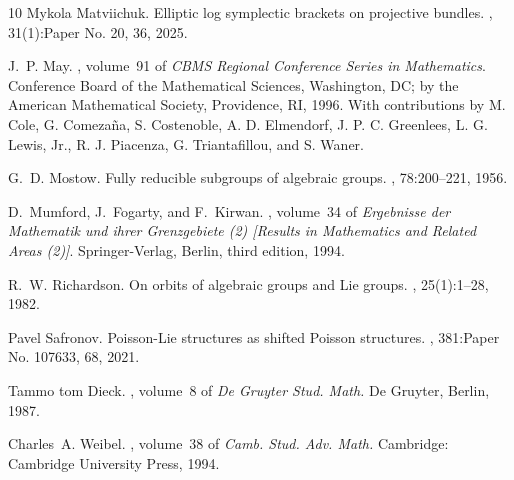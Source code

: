 \documentclass[11pt,leqno]{article}
\theoremstyle{plain}
\theoremstyle{plain}
\theoremstyle{plain}
\numberwithin{equation}{section}
\theoremstyle{nonumberplain}
\newcommand\1{{\bf 1}}
\begin{document}
\begin{thebibliography}{10}
Mykola Matviichuk.
\newblock Elliptic log symplectic brackets on projective bundles.
, 31(1):Paper No. 20, 36, 2025.

J.~P. May.
, volume~91 of {\em
  CBMS Regional Conference Series in Mathematics}.
\newblock Conference Board of the Mathematical Sciences, Washington, DC; by the
  American Mathematical Society, Providence, RI, 1996.
\newblock With contributions by M. Cole, G. Comeza\~na, S. Costenoble, A. D.
  Elmendorf, J. P. C. Greenlees, L. G. Lewis, Jr., R. J. Piacenza, G.
  Triantafillou, and S. Waner.

G.~D. Mostow.
\newblock Fully reducible subgroups of algebraic groups.
, 78:200--221, 1956.

D.~Mumford, J.~Fogarty, and F.~Kirwan.
, volume~34 of {\em Ergebnisse der
  Mathematik und ihrer Grenzgebiete (2) [Results in Mathematics and Related
  Areas (2)]}.
\newblock Springer-Verlag, Berlin, third edition, 1994.

R.~W. Richardson.
\newblock On orbits of algebraic groups and {L}ie groups.
, 25(1):1--28, 1982.

Pavel Safronov.
\newblock Poisson-{L}ie structures as shifted {P}oisson structures.
, 381:Paper No. 107633, 68, 2021.

Tammo tom Dieck.
, volume~8 of {\em De Gruyter Stud. Math.}
\newblock De Gruyter, Berlin, 1987.

Charles~A. Weibel.
, volume~38 of {\em Camb.
  Stud. Adv. Math.}
\newblock Cambridge: Cambridge University Press, 1994.

\end{thebibliography}

\Addresses
\end{document}
